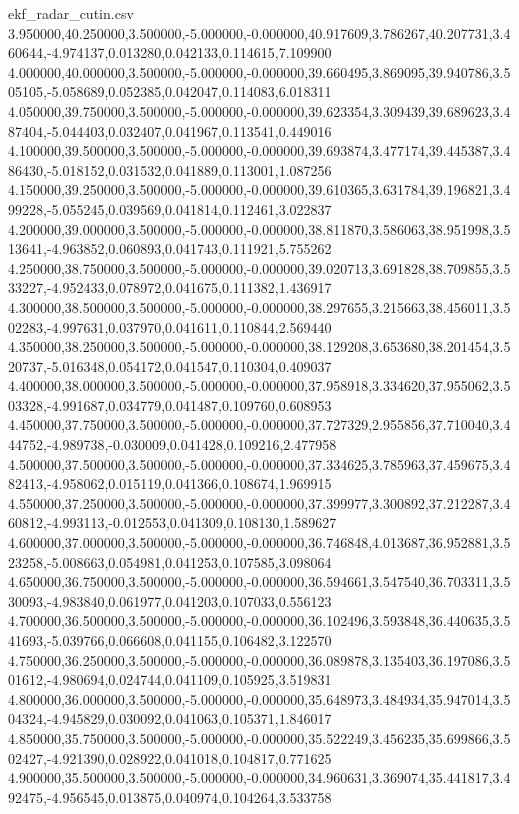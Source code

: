 \begin{filecontents*}[overwrite]{ekf_radar_cutin.csv}
3.950000,40.250000,3.500000,-5.000000,-0.000000,40.917609,3.786267,40.207731,3.460644,-4.974137,0.013280,0.042133,0.114615,7.109900
4.000000,40.000000,3.500000,-5.000000,-0.000000,39.660495,3.869095,39.940786,3.505105,-5.058689,0.052385,0.042047,0.114083,6.018311
4.050000,39.750000,3.500000,-5.000000,-0.000000,39.623354,3.309439,39.689623,3.487404,-5.044403,0.032407,0.041967,0.113541,0.449016
4.100000,39.500000,3.500000,-5.000000,-0.000000,39.693874,3.477174,39.445387,3.486430,-5.018152,0.031532,0.041889,0.113001,1.087256
4.150000,39.250000,3.500000,-5.000000,-0.000000,39.610365,3.631784,39.196821,3.499228,-5.055245,0.039569,0.041814,0.112461,3.022837
4.200000,39.000000,3.500000,-5.000000,-0.000000,38.811870,3.586063,38.951998,3.513641,-4.963852,0.060893,0.041743,0.111921,5.755262
4.250000,38.750000,3.500000,-5.000000,-0.000000,39.020713,3.691828,38.709855,3.533227,-4.952433,0.078972,0.041675,0.111382,1.436917
4.300000,38.500000,3.500000,-5.000000,-0.000000,38.297655,3.215663,38.456011,3.502283,-4.997631,0.037970,0.041611,0.110844,2.569440
4.350000,38.250000,3.500000,-5.000000,-0.000000,38.129208,3.653680,38.201454,3.520737,-5.016348,0.054172,0.041547,0.110304,0.409037
4.400000,38.000000,3.500000,-5.000000,-0.000000,37.958918,3.334620,37.955062,3.503328,-4.991687,0.034779,0.041487,0.109760,0.608953
4.450000,37.750000,3.500000,-5.000000,-0.000000,37.727329,2.955856,37.710040,3.444752,-4.989738,-0.030009,0.041428,0.109216,2.477958
4.500000,37.500000,3.500000,-5.000000,-0.000000,37.334625,3.785963,37.459675,3.482413,-4.958062,0.015119,0.041366,0.108674,1.969915
4.550000,37.250000,3.500000,-5.000000,-0.000000,37.399977,3.300892,37.212287,3.460812,-4.993113,-0.012553,0.041309,0.108130,1.589627
4.600000,37.000000,3.500000,-5.000000,-0.000000,36.746848,4.013687,36.952881,3.523258,-5.008663,0.054981,0.041253,0.107585,3.098064
4.650000,36.750000,3.500000,-5.000000,-0.000000,36.594661,3.547540,36.703311,3.530093,-4.983840,0.061977,0.041203,0.107033,0.556123
4.700000,36.500000,3.500000,-5.000000,-0.000000,36.102496,3.593848,36.440635,3.541693,-5.039766,0.066608,0.041155,0.106482,3.122570
4.750000,36.250000,3.500000,-5.000000,-0.000000,36.089878,3.135403,36.197086,3.501612,-4.980694,0.024744,0.041109,0.105925,3.519831
4.800000,36.000000,3.500000,-5.000000,-0.000000,35.648973,3.484934,35.947014,3.504324,-4.945829,0.030092,0.041063,0.105371,1.846017
4.850000,35.750000,3.500000,-5.000000,-0.000000,35.522249,3.456235,35.699866,3.502427,-4.921390,0.028922,0.041018,0.104817,0.771625
4.900000,35.500000,3.500000,-5.000000,-0.000000,34.960631,3.369074,35.441817,3.492475,-4.956545,0.013875,0.040974,0.104264,3.533758

\end{filecontents*}
